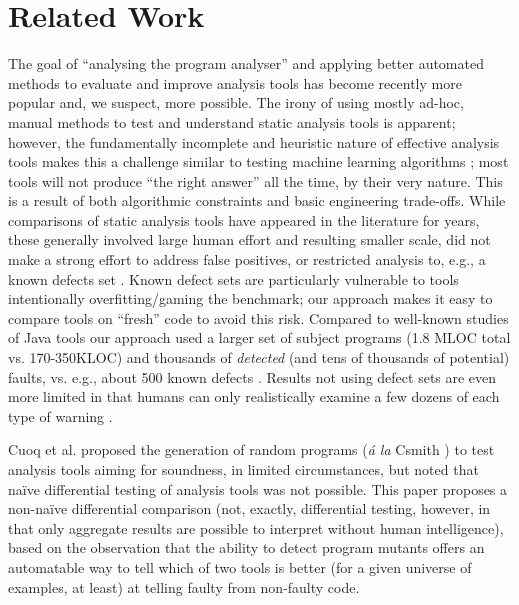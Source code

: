 \section{Related Work}

The goal of ``analysing the program analyser'' \cite{cadar2016analysing} and applying better automated methods to evaluate and improve analysis tools has become recently more popular and, we suspect, more possible.  The irony of using mostly ad-hoc, manual methods to test and understand static analysis tools is apparent; however, the fundamentally incomplete and heuristic nature of effective analysis tools makes this a challenge similar to testing machine learning algorithms \cite{OnlyOracle}; most tools will not produce ``the right answer'' all the time, by their very nature.  This is a result of both algorithmic constraints and basic engineering trade-offs.  While comparisons of static analysis tools \cite{CompareJavaTools,durieux2019empirical, Parizi,slither,pashchenko2017delta} have appeared in the literature for years, these generally involved large human effort and resulting smaller scale, did not make a strong effort to address false positives, or restricted analysis to, e.g., a known defects set \cite{AllBugs, do2016toward}.  Known defect sets are particularly vulnerable to tools intentionally overfitting/gaming the benchmark; our approach makes it easy to compare tools on ``fresh'' code to avoid this risk.  Compared to well-known studies of Java tools \cite{AllBugs,CompareJavaTools} our approach used a larger set of subject programs (1.8 MLOC total vs. 170-350KLOC) and thousands of \emph{detected} (and tens of thousands of potential) faults, vs. e.g., about 500 known defects \cite{AllBugs}.  Results not using defect sets are even more limited in that humans can only realistically examine a few dozens of each type of warning \cite{CompareJavaTools}.

Cuoq et al. \cite{regehrRandom} proposed the generation of random programs (\emph{\'a la} Csmith \cite{csmith}) to test analysis tools aiming for soundness, in limited circumstances, but noted that na\"ive differential testing of analysis tools was not possible.  This paper proposes a non-na\"ive differential comparison (not, exactly, differential testing, however, in that only aggregate results are possible to interpret without human intelligence), based on the observation that the ability to detect program mutants offers an automatable way to tell which of two tools is better (for a given universe of examples, at least) at telling faulty from non-faulty code.

